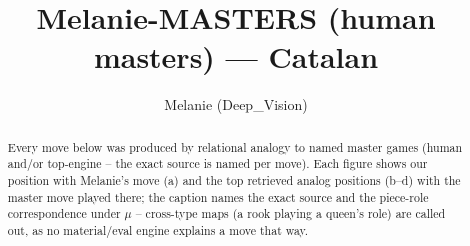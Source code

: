 \documentclass[11pt]{article}
\title{Melanie-MASTERS (human masters) — Catalan}
\author{Melanie (Deep\_Vision)}
\date{}
\begin{document}
\maketitle

\begin{abstract}Every move below was produced by relational analogy to named master games (human and/or top-engine -- the exact source is named per move). Each figure shows our position with Melanie's move (a) and the top retrieved analog positions (b--d) with the master move played there; the caption names the exact source and the piece-role correspondence under $\mu$ -- cross-type maps (a rook playing a queen's role) are called out, as no material/eval engine explains a move that way.\end{abstract}

\begin{figure}[p]\centering
\begin{subfigure}{0.46\textwidth}\centering
\resizebox{\linewidth}{!}{%
\newchessgame
\chessboard[
  setfen={rnbq1rk1/ppp1bppp/4pn2/8/2pP4/5NP1/PP2PPBP/RNBQ1RK1 w - - 0 7},
  showmover=false,
  pgfstyle=straightmove, color=movearrow, markmove={f3-e5}
]}
\caption{}
\end{subfigure}\hfill
\begin{subfigure}{0.46\textwidth}\centering
\resizebox{\linewidth}{!}{%
\newchessgame
\chessboard[
  setfen={r1bq1rk1/ppp1ppbp/5np1/1BP5/3P4/5N1P/PP3PP1/R1BQ1RK1 w - - 1 12},
  showmover=false,
  pgfstyle=straightmove, color=movearrow, markmove={f1-e1}
]}
\caption{}
\end{subfigure}
\\[4pt]
\begin{subfigure}{0.46\textwidth}\centering
\resizebox{\linewidth}{!}{%
\newchessgame
\chessboard[
  setfen={r2q1rk1/pp2ppbp/2p2np1/5b2/3P4/2P2N2/PP2BPPP/R1BQ1RK1 b - - 6 12},
  showmover=false,
  pgfstyle=straightmove, color=movearrow, markmove={f6-d5}
]}
\caption{}
\end{subfigure}\hfill
\begin{subfigure}{0.46\textwidth}\centering
\resizebox{\linewidth}{!}{%
\newchessgame
\chessboard[
  setfen={rnbq1rk1/4ppbp/1pP2np1/pP1p4/8/2P2NP1/PB2PPBP/RN1Q1RK1 b - - 0 11},
  showmover=false,
  pgfstyle=straightmove, color=movearrow, markmove={d8-d6}
]}
\caption{}
\end{subfigure}

\end{figure}
\end{document}
